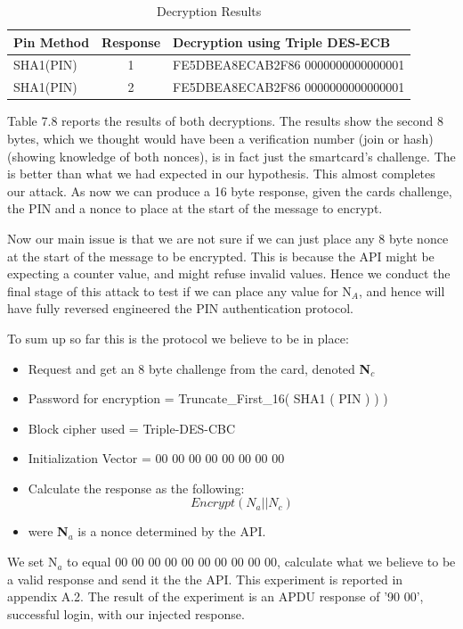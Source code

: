 \documentclass[bsc,frontabs,twoside,singlespacing,parskip,deptreport]{infthesis}     %
\begin{document}
\begin{table}[H]
\begin{tabular}{|l|c|l|}
\hline
Pin Method & Response & Decryption using Triple DES-ECB\\
\hline
SHA1(PIN) & 1 & FE5DBEA8ECAB2F86 0000000000000001\\
SHA1(PIN) & 2 & FE5DBEA8ECAB2F86 0000000000000001\\
\hline
\end{tabular}
\caption{Decryption Results}
\end{table}

Table 7.8 reports the results of both decryptions. The results show the second 8 bytes, which we thought would have been a verification number (join or hash) (showing knowledge of both nonces), is in fact just the smartcard's challenge. The is better than what we had expected in our hypothesis. This almost completes our attack. As now we can produce a 16 byte response, given the cards challenge, the PIN and a nonce to place at the start of the message to encrypt.

Now our main issue is that we are not sure if we can just place any 8 byte nonce at the start of the message to be encrypted. This is because the API might be expecting a counter value, and might refuse invalid values. Hence we conduct the final stage of this attack to test if we can place any value for N$_A$, and hence will have fully reversed engineered the PIN authentication protocol.

To sum up so far this is the protocol we believe to be in place:
\begin{itemize}
\item Request and get an 8 byte challenge from the card, denoted \textbf{N$_c$}
\item Password for encryption = Truncate\_First\_16( SHA1 ( PIN ) ) )
\item Block cipher used = Triple-DES-CBC
\item Initialization Vector = 00 00 00 00 00 00 00 00 
\item Calculate the response as the following:
$$ Encrypt(N_a || N_c) $$
\item were \textbf{N$_a$} is a nonce determined by the API.
\end{itemize}

We set N$_a$ to equal 00 00 00 00 00 00 00 00 00 00, calculate what we believe to be a valid response and send it the the API. This experiment is reported in appendix A.2. The result of the experiment is an APDU response of '90 00', successful login, with our injected response.
\end{document}
